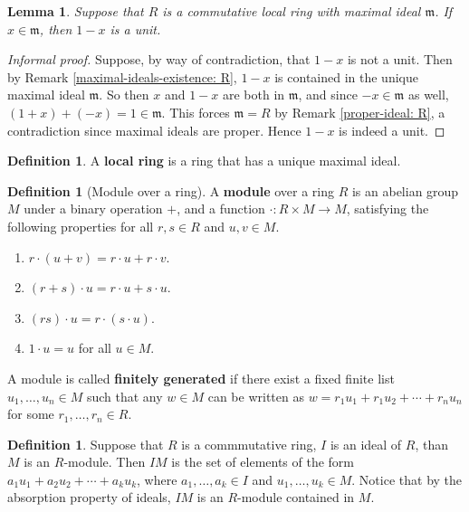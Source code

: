 \documentclass[12pt]{amsart}
\newtheorem{lemma}[theorem]{Lemma}
\theoremstyle{definition}
\newtheorem{definition}[theorem]{Definition}
\theoremstyle{remark}
\begin{document}
\begin{lemma} \label{units-local-ring: L}
Suppose that $R$ is a commutative local ring with maximal ideal $\mathfrak{m}$.  
If $x \in \mathfrak{m}$, then $1-x$ is a unit.
\end{lemma}

\begin{proof}[Informal proof]
Suppose, by way of contradiction, that $1-x$ is not a unit.  Then by Remark \ref{maximal-ideals-existence: R}, $1-x$ is contained in the unique maximal ideal $\mathfrak{m}$.  So then $x$ and $1-x$ are both in $\mathfrak{m}$, and since $-x \in \mathfrak{m}$ as well, $(1+x) + (-x) = 1 \in \mathfrak{m}$. 
This forces $\mathfrak{m} = R$ by Remark \ref{proper-ideal: R}, a contradiction since maximal ideals are proper. Hence $1-x$ is indeed a unit. 
\end{proof}


\begin{definition}
	A \textbf{local ring} is a ring that has a unique maximal ideal. 
\end{definition}


\begin{definition}[Module over a ring]
A \textbf{module} over a ring $R$ is an abelian group $M$ under a binary operation $+$, and a function $\cdot: R \times M \to M$, satisfying the following properties for all $r, s \in R$ and $u, v \in M$.
\begin{enumerate}[topsep=0cm,itemsep=0cm]
\item  $r \cdot (u + v)  = r \cdot u + r \cdot v$.
\item $(r+s) \cdot u = r \cdot u + s \cdot u$.
\item $(rs) \cdot u = r \cdot (s \cdot u)$.
\item $1 \cdot u = u$ for all $u \in M$.
\end{enumerate}
A module is called \textbf{finitely generated} if there exist a fixed finite list $u_1, \ldots, u_n \in M$ such that any 
$w \in M$ can be written as 
$
w = r_1 u_1 + r_1 u_2 + \cdots + r_n u_n
$
for some $r_1, \ldots, r_n \in R$. 
\end{definition}


\begin{definition}
	Suppose that $R$ is a commmutative ring, $I$ is an ideal of $R$, than $M$ is an $R$-module.  Then $IM$ is the set of elements of the form 
	$a_1 u_1 + a_2 u_2 + \cdots + a_k u_k$, where $a_1, \ldots, a_k \in I$ and $u_1, \ldots, u_k \in M$.  
Notice that by the absorption property of ideals, $IM$ is an $R$-module contained in $M$. 	
\end{definition}
\end{document}
